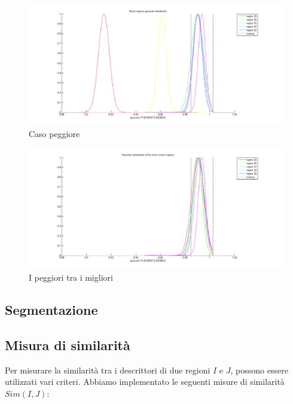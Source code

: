 \begin{figure}
\begin{center}
\includegraphics[width=.95\textwidth]{img/worst_graph}
\caption{ Caso peggiore }
\label{fig:worstGraph}
\end{center}
\end{figure}

\begin{figure}
\begin{center}
\includegraphics[width=.95\textwidth]{img/worst_best_graph}
\caption{ I peggiori tra i migliori }
\label{fig:worstBestGraph}
\end{center}
\end{figure}



\subsection{Segmentazione}

\subsection{Misura di similarità}

Per misurare la similarità tra i descrittori di due regioni $I$ e $J$, possono essere utilizzati vari criteri. Abbiamo implementato le seguenti misure di similarità $Sim(I, J)$:

